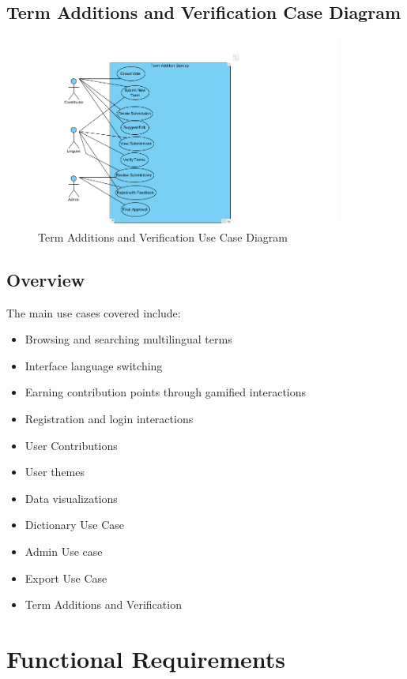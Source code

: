 \documentclass[12pt]{article}
\begin{document}
\subsection{Term Additions and Verification Case Diagram}
\begin{figure}[H]
  \centering
  \includegraphics[width=0.9\textwidth]{TermAdditions.png}
  \caption{Term Additions and Verification Use Case Diagram}
  \label{fig:Term Additions and Verification}
\end{figure}

\subsection{Overview}
The main use cases covered include:
\begin{itemize}
  \item Browsing and searching multilingual terms
  \item Interface language switching
  \item Earning contribution points through gamified interactions
  \item Registration and login interactions
  \item User Contributions
  \item User themes
  \item Data visualizations
  \item Dictionary Use Case
  \item Admin Use case
  \item Export Use Case
  \item Term Additions and Verification
\end{itemize}

\section{Functional Requirements}
\end{document}
